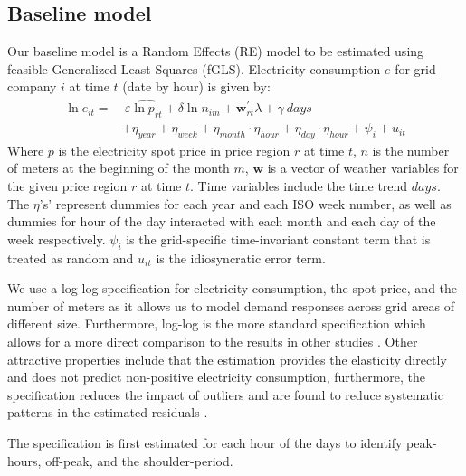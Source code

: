 \label{sec:empirical}
\subsection{Baseline model}
\label{subsec:e_model}
Our baseline model is a Random Effects (RE) model to be estimated using feasible Generalized Least Squares (fGLS). Electricity consumption $e$ for grid company $i$ at time $t$ (date by hour) is given by:
\begin{equation}
  \begin{split}
  \ln e_{it}=&\ \varepsilon \hat{\ln p_{rt}}+\delta\ln n_{im}+\bm{w}^{'}_{rt}\lambda+\gamma\ days\\
  &+\eta_{year}+\eta_{week}+\eta_{month}\cdot\eta_{hour}+\eta_{day}\cdot\eta_{hour}+\psi_i+u_{it}
  \end{split}
  \label{eq:baseline}
\end{equation}
Where $p$ is the electricity spot price in price region $r$ at time $t$, $n$ is the number of meters at the beginning of the month $m$, $\bm{w}$ is a vector of weather variables for the given price region $r$ at time $t$. Time variables include the time trend $days$. The $\eta$'s' represent dummies for each year and each ISO week number, as well as dummies for hour of the day interacted with each month and each day of the week respectively. $\psi_i$ is the grid-specific time-invariant constant term that is treated as random and $u_{it}$ is the idiosyncratic error term.
\par\vspace{-1em}
We use a log-log specification for electricity consumption, the spot price, and the number of meters as it allows us to model demand responses across grid areas of different size. Furthermore, log-log is the more standard specification which allows for a more direct comparison to the results in other studies \citep{burke2017price}. Other attractive properties include that the estimation provides the elasticity directly and does not predict non-positive electricity consumption, furthermore, the specification reduces the impact of outliers and are found to reduce systematic patterns in the estimated residuals \citep{burke2017price}.
\par\vspace{-1em}
The specification is first estimated for each hour of the days to identify peak-hours, off-peak, and the shoulder-period.

